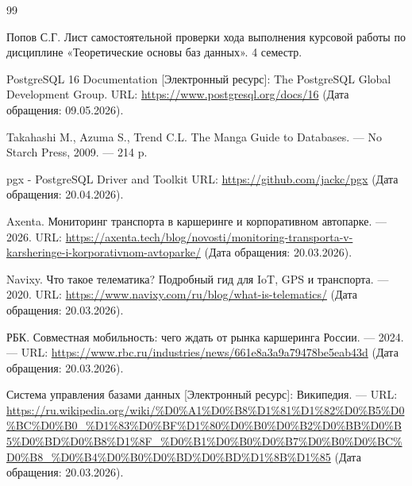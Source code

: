 \begin{thebibliography}{99}

Попов С.Г. Лист самостоятельной проверки хода выполнения курсовой
работы по дисциплине «Теоретические основы баз данных». 4 семестр.

PostgreSQL 16 Documentation [Электронный ресурс]: The PostgreSQL
Global Development Group.
URL: \url{https://www.postgresql.org/docs/16} (Дата обращения: 09.05.2026).

Takahashi M., Azuma S., Trend C.L. The Manga Guide to Databases. — No
Starch Press, 2009. — 214 p.

pgx - PostgreSQL Driver and Toolkit
URL: \url{https://github.com/jackc/pgx}
(Дата обращения: 20.04.2026).

Axenta. Мониторинг транспорта в каршеринге и корпоративном автопарке. — 2026. URL: \url{https://axenta.tech/blog/novosti/monitoring-transporta-v-karsheringe-i-korporativnom-avtoparke/} (Дата обращения: 20.03.2026).

Navixy. Что такое телематика? Подробный гид для IoT, GPS и транспорта. — 2020. URL: \url{https://www.navixy.com/ru/blog/what-is-telematics/} (Дата обращения: 20.03.2026).

РБК. Совместная мобильность: чего ждать от рынка каршеринга России. — 2024. — URL: \url{https://www.rbc.ru/industries/news/661e8a3a9a79478be5eab43d} (Дата обращения: 20.03.2026).

Система управления базами данных [Электронный ресурс]: Википедия. — URL: \url{https://ru.wikipedia.org/wiki/%D0%A1%D0%B8%D1%81%D1%82%D0%B5%D0%BC%D0%B0_%D1%83%D0%BF%D1%80%D0%B0%D0%B2%D0%BB%D0%B5%D0%BD%D0%B8%D1%8F_%D0%B1%D0%B0%D0%B7%D0%B0%D0%BC%D0%B8_%D0%B4%D0%B0%D0%BD%D0%BD%D1%8B%D1%85}
(Дата обращения: 20.03.2026).
\end{thebibliography}